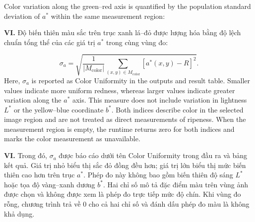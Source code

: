 \documentclass[final,1p,11pt,longtitle]{elsarticle}
\newenvironment{viet}{\par\smallskip\begingroup\color{viColor}\noindent\textbf{VI. }\ignorespaces}{\par\endgroup\smallskip}
\begin{document}
Color variation along the green--red axis is quantified by the population standard deviation of $a^*$ within the same measurement region:

\begin{viet}
Độ biến thiên màu sắc trên trục xanh lá--đỏ được lượng hóa bằng độ lệch chuẩn tổng thể của các giá trị $a^*$ trong cùng vùng đo:
\end{viet}

\begin{equation}
\sigma_a=\sqrt{\frac{1}{|M_{\mathrm{color}}|}\sum_{(x,y)\in M_{\mathrm{color}}}\left[a^*(x,y)-R\right]^2}.
\end{equation}
Here, $\sigma_a$ is reported as Color Uniformity in the outputs and result table. Smaller values indicate more uniform redness, whereas larger values indicate greater variation along the $a^*$ axis. This measure does not include variation in lightness $L^*$ or the yellow--blue coordinate $b^*$. Both indices describe color in the selected image region and are not treated as direct measurements of ripeness. When the measurement region is empty, the runtime returns zero for both indices and marks the color measurement as unavailable.

\begin{viet}
Trong đó, $\sigma_a$ được báo cáo dưới tên Color Uniformity trong đầu ra và bảng kết quả. Giá trị nhỏ biểu thị sắc đỏ đồng đều hơn; giá trị lớn biểu thị mức biến thiên cao hơn trên trục $a^*$. Phép đo này không bao gồm biến thiên độ sáng $L^*$ hoặc tọa độ vàng--xanh dương $b^*$. Hai chỉ số mô tả đặc điểm màu trên vùng ảnh được chọn và không được xem là phép đo trực tiếp mức độ chín. Khi vùng đo rỗng, chương trình trả về 0 cho cả hai chỉ số và đánh dấu phép đo màu là không khả dụng.
\end{viet}
\end{document}
